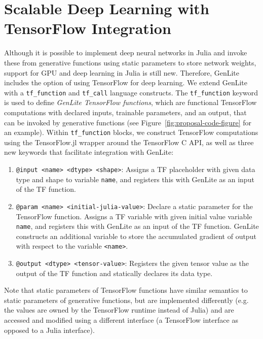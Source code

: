 \section{Scalable Deep Learning with TensorFlow Integration}



Although it is possible to implement deep neural networks in Julia and invoke these from generative functions using static parameters to store network weights, support for GPU and deep learning in Julia is still new.
Therefore, GenLite includes the option of using TensorFlow for deep learning.
We extend GenLite with a \texttt{tf\_function} and \texttt{tf\_call} language constructs.
The \texttt{tf\_function} keyword is used to define \emph{GenLite TensorFlow functions}, which are functional TensorFlow computations with declared inputs, trainable parameters, and an output, that can be invoked by generative functions (see Figure~\ref{fig:proposal-code-figure} for an example).
Within \texttt{tf\_function} blocks, we construct TensorFlow computations using the TensorFlow.jl \cite{?} wrapper around the TensorFlow C API, as well as three new keywords that facilitate integration with GenLite:
\begin{enumerate}
\item \texttt{@input <name> <dtype> <shape>}:
Assigns a TF placeholder with given data type and shape to variable \texttt{name}, and registers this with GenLite as an input of the TF function.
\item \texttt{@param <name> <initial-julia-value>}:
Declare a static parameter for the TensorFlow function.
Assigns a TF variable with given initial value variable \texttt{name}, and registers this with GenLite as an input of the TF function.
GenLite constructs an additional variable to store the accumulated gradient of output with respect to the variable \texttt{<name>}.
\item \texttt{@output <dtype> <tensor-value>}:
Registers the given tensor value as the output of the TF function and statically declares its data type.
\end{enumerate}
Note that static parameters of TensorFlow functions have similar semantics to static parameters of generative functions, but are implemented differently (e.g. the values are owned by the TensorFlow runtime instead of Julia) and are accessed and modified using a different interface (a TensorFlow interface as opposed to a Julia interface).

